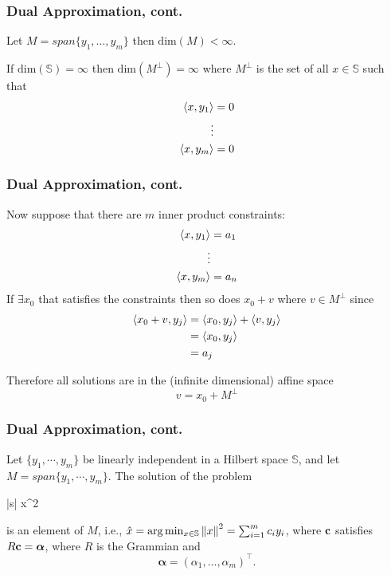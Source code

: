 \documentclass{beamer}
\begin{document}
\begin{frame}\frametitle{Dual Approximation, cont.}
	Let $M = span\{y_1, \ldots, y_m\}$ then $\text{dim}(M) < \infty$.
	
	\vfill
	
	If $\text{dim}(\mathbb{S}) = \infty$ then $\text{dim}(M^{\perp}) = \infty$ where $M^{\perp}$ is the set of all $x \in \mathbb{S}$ such that
	\begin{align*}
	\left<x, y_1\right> &= 0 \\
	\vdots \\
	\left<x, y_m\right> &=0	
	\end{align*}
\end{frame}

\begin{frame}\frametitle{Dual Approximation, cont.}	

	Now suppose that there are $m$ inner product constraints:
	\begin{align*}
	\left< x, y_1\right> &= a_1\\
	\vdots\\
	\left< x, y_m\right> &= a_n
	\end{align*}
	If $\exists x_0$ that satisfies the constraints then so does $x_0 + v$ where $v \in M^{\perp}$ since
	\begin{align*}
	\left< x_0+v, y_j\right> &= \left< x_0, y_j\right> + \left<v, y_j\right> \\
						&= \left< x_0,y_j\right> \\
						&= a_j 
	\end{align*}
	
	Therefore all solutions are in the (infinite dimensional) affine space
	\[ v = x_0 + M^{\perp} \]
	
\end{frame}

\begin{frame}\frametitle{Dual Approximation, cont.}	
	\begin{theorem}
		Let $\{ y_1, \cdots, y_m\} $ be linearly independent in a Hilbert
		space $\mathbb{S}$, and let $M = span\{y_1, \cdots, y_m\}$.	
		The solution of the problem
		\begin{mini*}|s|
		{x\in {}}{^2}{}{}
		\addConstraint{\vdots}
		\end{mini*}
		is an element of $M$, i.e., $\hat{x} = \arg\min_{x\in\mathbb{S}}\left\|x\right\|^2 = \sum_{i=1}^{m} c_i y_i$,
		where $\mathbf{c}$ satisfies $R\mathbf{c} = \boldsymbol{\alpha}$, where $R$ is the Grammian and 
		\[
			\boldsymbol{\alpha} = (\alpha_1, \dots, \alpha_m)^\top.
		\]
	\end{theorem}
	
\end{frame}
\end{document}
